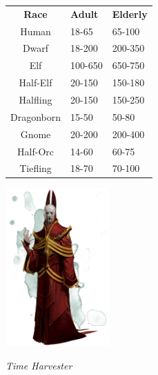 \begin{table}[H]
	\begin{tabular}{cll}
		\textbf{Race} & \textbf{Adult} & \textbf{Elderly} \\
		Human & 18-65 & 65-100 \\
	 	Dwarf & 18-200 & 200-350 \\
		Elf & 100-650 & 650-750 \\
		Half-Elf & 20-150 & 150-180 \\
		Halfling & 20-150 & 150-250 \\
		Dragonborn & 15-50 & 50-80 \\
		Gnome & 20-200 & 200-400 \\
		Half-Orc & 14-60 & 60-75 \\
	 	Tiefling & 18-70 & 70-100 \\
	\end{tabular}
\end{table} 

\begin{center}
	\includegraphics[width = 0.3\textwidth]{time-harvester}
	
	\emph{Time Harvester}
\end{center}